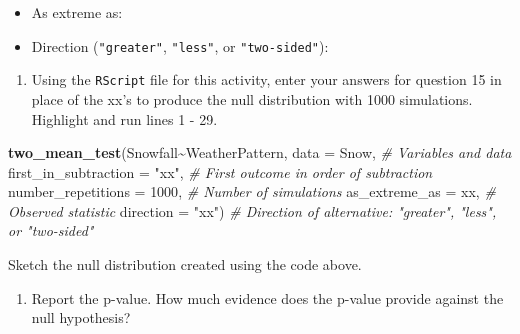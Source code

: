 \documentclass[
]{report}
\newenvironment{Shaded}{\begin{snugshade}}{\end{snugshade}}
\newcommand{\CommentTok}[1]{\textcolor[rgb]{0.56,0.35,0.01}{\textit{#1}}}
\newcommand{\DataTypeTok}[1]{\textcolor[rgb]{0.13,0.29,0.53}{#1}}
\newcommand{\DecValTok}[1]{\textcolor[rgb]{0.00,0.00,0.81}{#1}}
\newcommand{\KeywordTok}[1]{\textcolor[rgb]{0.13,0.29,0.53}{\textbf{#1}}}
\newcommand{\NormalTok}[1]{#1}
\newcommand{\OperatorTok}[1]{\textcolor[rgb]{0.81,0.36,0.00}{\textbf{#1}}}
\newcommand{\StringTok}[1]{\textcolor[rgb]{0.31,0.60,0.02}{#1}}
\providecommand{\tightlist}{%
  \setlength{\itemsep}{0pt}\setlength{\parskip}{0pt}}
\begin{document}
\begin{itemize}
\tightlist
\item
  As extreme as:
\end{itemize}

\vspace{.2in}

\begin{itemize}
\tightlist
\item
  Direction (\texttt{"greater"}, \texttt{"less"}, or \texttt{"two-sided"}):
\end{itemize}

\vspace{.2in}

\begin{enumerate}
\def\labelenumi{\arabic{enumi}.}
\setcounter{enumi}{15}
\tightlist
\item
  Using the \texttt{RScript} file for this activity, enter your answers for question 15 in place of the xx's to produce the null distribution with 1000 simulations. Highlight and run lines 1 - 29.
\end{enumerate}

\begin{Shaded}
\begin{Highlighting}[]
\KeywordTok{two\_mean\_test}\NormalTok{(Snowfall}\OperatorTok{\textasciitilde{}}\NormalTok{WeatherPattern, }\DataTypeTok{data =}\NormalTok{ Snow,  }\CommentTok{\# Variables and data}
                    \DataTypeTok{first\_in\_subtraction =} \StringTok{"xx"}\NormalTok{, }\CommentTok{\# First outcome in order of subtraction}
                    \DataTypeTok{number\_repetitions =} \DecValTok{1000}\NormalTok{,  }\CommentTok{\# Number of simulations}
                    \DataTypeTok{as\_extreme\_as =}\NormalTok{ xx,  }\CommentTok{\# Observed statistic}
                    \DataTypeTok{direction =} \StringTok{"xx"}\NormalTok{)  }\CommentTok{\# Direction of alternative: "greater", "less", or "two{-}sided"}
\end{Highlighting}
\end{Shaded}

Sketch the null distribution created using the code above.
\vspace{1.5in}

\begin{enumerate}
\def\labelenumi{\arabic{enumi}.}
\setcounter{enumi}{16}
\tightlist
\item
  Report the p-value. How much evidence does the p-value provide against the null hypothesis?
\end{enumerate}
\end{document}
